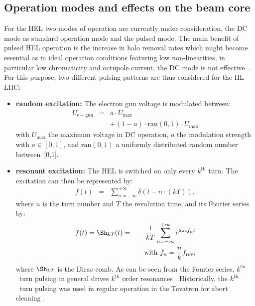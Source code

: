 \documentclass[%
 reprint,
 amsmath,amssymb,
 aps,
prstab,
]{revtex4-1}
\begin{document}
\subsection{Operation modes and effects on the beam core\label{sec:hel:core}}
For the HEL two modes of operation are currently under consideration, the DC mode as standard operation mode and the pulsed mode. The main benefit of pulsed HEL operation is the increase in halo removal rates which might become essential as in ideal operation conditions featuring low non-linearities, in particular low chromaticity and octupole current, the DC mode is not effective~\cite{hel_halo_hllhc_fitterer,hl_halo_ipac2017}. 
For this purpose, two different pulsing patterns are thus considered for the HL-LHC:
\begin{itemize}
	\item \textbf{random excitation:} The electron gun voltage is modulated between:
	\begin{eqnarray}
	U_{\mathrm{e-gun}}&=&a\cdot U_{\mathrm{max}}\\
	& &+(1-a)\cdot \mathrm{ran}(0,1)\cdot U_{\mathrm{max}}
	\end{eqnarray}
	with $U_{\mathrm{max}}$ the maximum voltage in DC operation, $a$ the modulation strength with $a\in[0,1]$, and $\mathrm{ran}(0,1)$ a uniformly distributed random number between~[0,1].
	\item \textbf{resonant excitation:} The HEL is switched on only every $k^{\mathrm{th}}$ turn. The excitation can then be represented by:
	\begin{eqnarray}\label{intro:eqn:1}
	f(t)&=&\sum_{n=-\infty}^{+\infty}\delta(t-n\cdot(kT)),
	\end{eqnarray}
	where $n$ is the turn number and $T$ the revolution time, and its Fourier series by:
	\begin{eqnarray}\label{intro:eqn:2}
	f(t)=\Sh_{kT}(t)
	&=&\frac{1}{kT}\sum_{n=-\infty}^{+\infty}e^{2\pi i f_nt} \\
	& & \quad \text{with} \ f_n=\frac{n}{k}f_{\rm rev},
	\end{eqnarray}
	where $\Sh_{kT}$ is the Dirac comb. As can be seen from the Fourier series, $k^{\mathrm{th}}$~turn pulsing in general drives $k^{\mathrm{th}}$ order resonances \cite{md_sim_hel_res_ex_fitterer}. Historically, the $k^{\mathrm{th}}$~turn pulsing was used in regular operation in the Tevatron for abort cleaning \cite{hel_tevatron_abortgap_zhang}.
\end{itemize}
\end{document}
